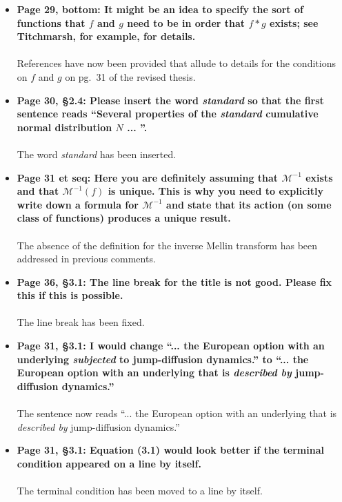 \documentclass{article}
\begin{document}
\begin{enumerate}
\begin{itemize}
						\item{\textbf{Page 29, bottom:  It might be an idea to specify the sort of functions that $f$ and $g$ need to be in order that $f \ast g$ exists; see Titchmarsh, for example, for details.
			\\\\}}
			References have now been provided that allude to details for the conditions on $f$ and $g$ on pg.~31 of the revised thesis.
			
			\item{\textbf{Page 30, \S 2.4: Please insert the word \emph{standard} so that the first sentence reads ``Several properties of the \emph{standard} cumulative normal distribution $N$ ... ''.
			\\\\}}
			The word \emph{standard} has been inserted.
			
						
			\item{\textbf{Page 31 et seq:  Here you are definitely assuming that $\mathscr{M}^{-1}$ exists and that $\mathscr{M}^{-1}(f)$ is unique. This is why you need to explicitly write down a formula for $\mathscr{M}^{-1}$ and state that its action (on some class of functions) produces a unique result.
			\\\\}}
			The absence of the definition for the inverse Mellin transform has been addressed in previous comments.
			
			\item{\textbf{Page 36, \S3.1:  The line break for the title is not good. Please fix this if this is possible.
			\\\\}}
			The line break has been fixed.
			
			\item{\textbf{Page 31, \S3.1:  I would change ``... the European option with an underlying \emph{subjected} to jump-diffusion dynamics.'' to ``... the European option with an underlying that is \emph{described by} jump-diffusion dynamics.''
			\\\\}}
			The sentence now reads ``... the European option with an underlying that is \emph{described by} jump-diffusion dynamics.''
			\item{\textbf{Page 31, \S3.1:  Equation (3.1) would look better if the terminal condition appeared on a line by itself. \\\\}}
			The terminal condition has been moved to a line by itself.
			

\end{itemize}
\end{enumerate}
\end{document}
